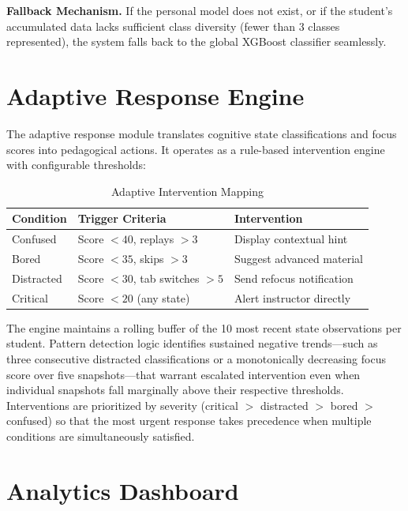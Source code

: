 \documentclass[conference]{IEEEtran}
\begin{document}
\textbf{Fallback Mechanism.} If the personal model does not exist, or if the student's accumulated data lacks sufficient class diversity (fewer than 3 classes represented), the system falls back to the global XGBoost classifier seamlessly.

\section{Adaptive Response Engine}

The adaptive response module translates cognitive state classifications and focus scores into pedagogical actions. It operates as a rule-based intervention engine with configurable thresholds:

\begin{table}[h]
\caption{Adaptive Intervention Mapping}
\label{tab:interventions}
\centering
\small
\begin{tabular}{@{}p{1.5cm}p{2.5cm}p{3.2cm}@{}}
\toprule
\textbf{Condition} & \textbf{Trigger Criteria} & \textbf{Intervention} \\
\midrule
Confused & Score $< 40$, replays $> 3$ & Display contextual hint \\
Bored & Score $< 35$, skips $> 3$ & Suggest advanced material \\
Distracted & Score $< 30$, tab switches $> 5$ & Send refocus notification \\
Critical & Score $< 20$ (any state) & Alert instructor directly \\
\bottomrule
\end{tabular}
\end{table}

The engine maintains a rolling buffer of the 10 most recent state observations per student. Pattern detection logic identifies sustained negative trends---such as three consecutive distracted classifications or a monotonically decreasing focus score over five snapshots---that warrant escalated intervention even when individual snapshots fall marginally above their respective thresholds. Interventions are prioritized by severity (critical $>$ distracted $>$ bored $>$ confused) so that the most urgent response takes precedence when multiple conditions are simultaneously satisfied.

\section{Analytics Dashboard}
\end{document}
